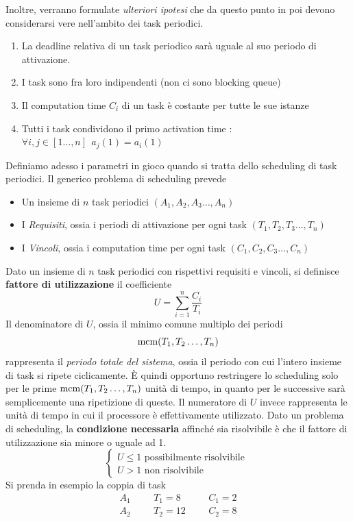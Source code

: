\documentclass[10pt, letterpaper]{report}
\begin{document}
Inoltre, verranno formulate \textit{ulteriori ipotesi} che da questo punto in poi devono considerarsi vere 
nell'ambito dei task periodici.\begin{enumerate}
    \item La deadline relativa di un task periodico sarà uguale al suo periodo di attivazione.
    \item I task sono fra loro indipendenti (non ci sono blocking queue)
    \item Il computation time $C_i$ di un task è costante per tutte le sue istanze 
    \item Tutti i task condividono il primo activation time : $\forall i,j\in[1\dots, n] \ \ a_j(1)=a_i(1)$
\end{enumerate}
Definiamo adesso i parametri in gioco quando si tratta dello scheduling di task periodici. Il generico problema 
di scheduling prevede \begin{itemize}
    \item Un insieme di $n$ task periodici $(A_1,A_2,A_3\dots,A_n)$ 
    \item I \textit{Requisiti}, ossia i periodi di attivazione per ogni task $(T_1,T_2,T_3\dots,T_n)$
    \item I \textit{Vincoli}, ossia i computation time per ogni task $(C_1,C_2,C_3\dots,C_n)$
\end{itemize}
 Dato un insieme di $n$ task periodici con rispettivi requisiti e vincoli, si definisce 
\textbf{fattore di utilizzazione} il coefficiente $$ 
U=\sum_{i=1}^n\frac{C_i}{T_i}
$$
Il denominatore di $U$, ossia il minimo comune multiplo dei periodi 
$$ {\text{mcm}}(T_1,T_2\dots,T_n)$$
rappresenta il \textit{periodo totale del sistema}, ossia il periodo con cui l'intero insieme 
di task si ripete ciclicamente. È quindi opportuno restringere lo scheduling solo per le 
prime ${\text{mcm}}(T_1,T_2\dots,T_n)$ unità di tempo, in quanto per le successive sarà semplicemente 
una ripetizione di queste. Il numeratore di $U$ invece rappresenta le unità di tempo in cui 
il processore è effettivamente utilizzato.\acc 
Dato un problema di scheduling, la \textbf{condizione necessaria} affinché sia risolvibile è che 
il fattore di utilizzazione sia minore o uguale ad 1. $$ \begin{cases}
    U\le 1 \text{ possibilmente risolvibile }\\ 
    U>1 \text{ non risolvibile}
\end{cases}$$
Si prenda in esempio la coppia di task $$ 
\begin{matrix}
    A_1 & & & T_1=8 & & & C_1 =2\\ 
    A_2 & & & T_2=12 & & & C_2=8
\end{matrix}
$$
\end{document}
